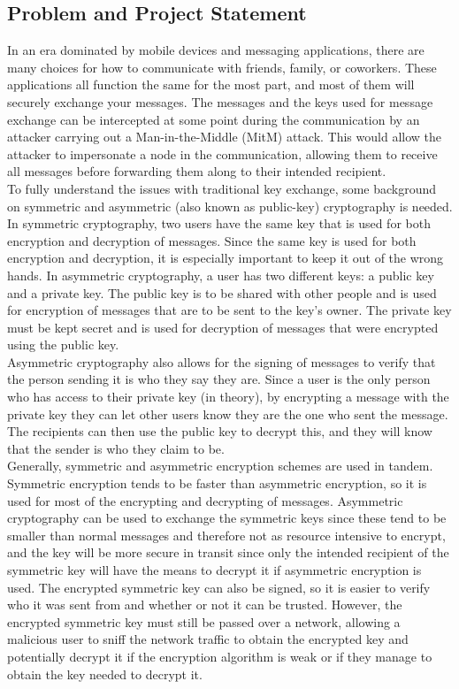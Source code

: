 \documentclass[11pt]{article}
\begin{document}
\subsection{Problem and Project Statement}
In an era dominated by mobile devices and messaging applications, there are many choices for how to communicate with friends, family, or coworkers. These applications all function the same for the most part, and most of them will securely exchange your messages. The messages and the keys used for message exchange can be intercepted at some point during the communication by an attacker carrying out a Man-in-the-Middle (MitM) attack. This would allow the attacker to impersonate a node in the communication, allowing them to receive all messages before forwarding them along to their intended recipient. \\

To fully understand the issues with traditional key exchange, some background on symmetric and  asymmetric (also known as public-key) cryptography is needed. In symmetric cryptography, two users have the same key that is used for both encryption and decryption of messages. Since the same key is used for both encryption and decryption, it is especially important to keep it out of the wrong hands. In asymmetric cryptography, a user has two different keys: a public key and a private key. The public key is to be shared with other people and is used for encryption of messages that are to be sent to the key’s owner. The private key must be kept secret and is used for decryption of messages that were encrypted using the public key. \\

Asymmetric cryptography also allows for the signing of messages to verify that the person sending it is who they say they are. Since a user is the only person who has access to their private key (in theory), by encrypting a message with the private key they can let other users know they are the one who sent the message. The recipients can then use the public key to decrypt this, and they will know that the sender is who they claim to be. \\

Generally, symmetric and asymmetric encryption schemes are used in tandem. Symmetric encryption tends to be faster than asymmetric encryption, so it is used for most of the  encrypting and decrypting of messages. Asymmetric cryptography can be used to exchange the symmetric keys since these tend to be smaller than normal messages and therefore not as resource intensive to encrypt, and the key will be more secure in transit since only the intended recipient of the symmetric key will have the means to decrypt it if asymmetric encryption is used. The encrypted symmetric key can also be signed, so it is easier to verify who it was sent from and whether or not it can be trusted. However, the encrypted symmetric key must still be passed over a network, allowing a malicious user to sniff the network traffic to obtain the encrypted key and potentially decrypt it if the encryption algorithm is weak or if they manage to obtain the key needed to decrypt it. \\
\end{document}
